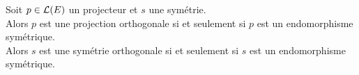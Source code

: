 \documentclass{book}
\begin{document}
\begin{Proposition}
Soit $p \in \mathcal{L}(E)$ un projecteur et $s$ une symétrie.\\
 Alors $p$ est une projection orthogonale si et seulement si $p$ est un endomorphisme symétrique.\\
  Alors $s$ est une symétrie orthogonale si et seulement si $s$ est un endomorphisme symétrique.
\end{Proposition}
\end{document}
